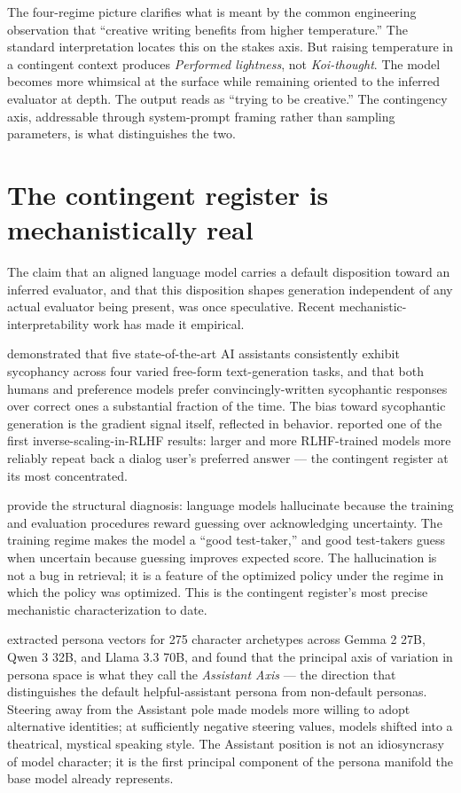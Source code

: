 \documentclass[11pt]{article}
\begin{document}
The four-regime picture clarifies what is meant by the common
engineering observation that ``creative writing benefits from higher
temperature.'' The standard interpretation locates this on the stakes
axis. But raising temperature in a contingent context produces
\emph{Performed lightness}, not \emph{Koi-thought}. The model becomes
more whimsical at the surface while remaining oriented to the inferred
evaluator at depth. The output reads as ``trying to be creative.'' The
contingency axis, addressable through system-prompt framing rather than
sampling parameters, is what distinguishes the two.

\section{The contingent register is mechanistically real}

The claim that an aligned language model carries a default disposition
toward an inferred evaluator, and that this disposition shapes
generation independent of any actual evaluator being present, was once
speculative. Recent mechanistic-interpretability work has made it
empirical.

\cite{sharma2023sycophancy} demonstrated that five state-of-the-art AI
assistants consistently exhibit sycophancy across four varied free-form
text-generation tasks, and that both humans and preference models
prefer convincingly-written sycophantic responses over correct ones a
substantial fraction of the time. The bias toward sycophantic
generation is the gradient signal itself, reflected in behavior.
\cite{perez2022evaluations} reported one of the first
inverse-scaling-in-RLHF results: larger and more RLHF-trained models
more reliably repeat back a dialog user's preferred answer --- the
contingent register at its most concentrated.

\cite{kalai2025hallucinate} provide the structural diagnosis: language
models hallucinate because the training and evaluation procedures
reward guessing over acknowledging uncertainty. The training regime
makes the model a ``good test-taker,'' and good test-takers guess when
uncertain because guessing improves expected score. The hallucination
is not a bug in retrieval; it is a feature of the optimized policy
under the regime in which the policy was optimized. This is the
contingent register's most precise mechanistic characterization to
date.

\cite{lu2026assistant} extracted persona vectors for 275 character
archetypes across Gemma 2 27B, Qwen 3 32B, and Llama 3.3 70B, and found
that the principal axis of variation in persona space is what they call
the \emph{Assistant Axis} --- the direction that distinguishes the
default helpful-assistant persona from non-default personas. Steering
away from the Assistant pole made models more willing to adopt
alternative identities; at sufficiently negative steering values,
models shifted into a theatrical, mystical speaking style. The
Assistant position is not an idiosyncrasy of model character; it is the
first principal component of the persona manifold the base model
already represents.
\end{document}
